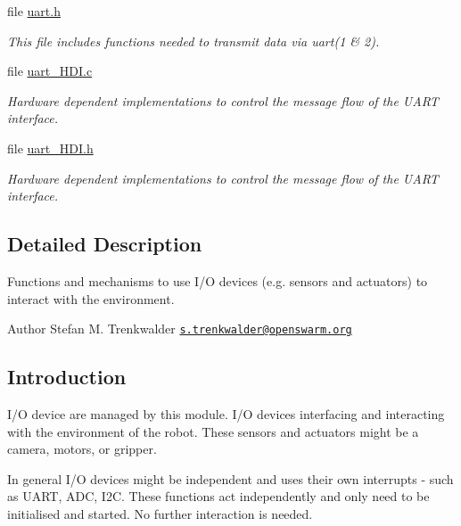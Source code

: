 \begin{DoxyCompactItemize}
file \hyperlink{uart_8h}{uart.\+h}
\begin{DoxyCompactList}\small\item\em This file includes functions needed to transmit data via uart(1 \& 2). \end{DoxyCompactList}\item 
file \hyperlink{uart__HDI_8c}{uart\+\_\+\+H\+D\+I.\+c}
\begin{DoxyCompactList}\small\item\em Hardware dependent implementations to control the message flow of the U\+A\+R\+T interface. \end{DoxyCompactList}\item 
file \hyperlink{uart__HDI_8h}{uart\+\_\+\+H\+D\+I.\+h}
\begin{DoxyCompactList}\small\item\em Hardware dependent implementations to control the message flow of the U\+A\+R\+T interface. \end{DoxyCompactList}\end{DoxyCompactItemize}


\subsection{Detailed Description}
Functions and mechanisms to use I/\+O devices (e.\+g. sensors and actuators) to interact with the environment. 

\begin{DoxyAuthor}{Author}
Stefan M. Trenkwalder \href{mailto:s.trenkwalder@openswarm.org}{\tt s.\+trenkwalder@openswarm.\+org}
\end{DoxyAuthor}
\hypertarget{group__io_io_intro}{}\subsection{Introduction}\label{group__io_io_intro}
I/\+O device are managed by this module. I/\+O devices interfacing and interacting with the environment of the robot. These sensors and actuators might be a camera, motors, or gripper.

In general I/\+O devices might be independent and uses their own interrupts -\/ such as U\+A\+R\+T, A\+D\+C, I2\+C. These functions act independently and only need to be initialised and started. No further interaction is needed.

